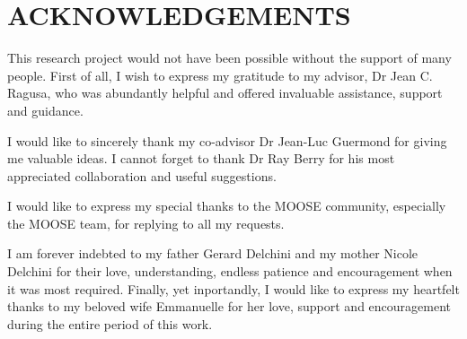 %
%
%


\chapter*{ACKNOWLEDGEMENTS}


\indent This research project would not have been possible without the support of many people. First of all, I wish to express my gratitude to my advisor, Dr Jean C. Ragusa, who was abundantly helpful and offered invaluable assistance, support and guidance. 

I would like to sincerely thank my co-advisor Dr Jean-Luc Guermond for giving me valuable ideas. I cannot forget to thank Dr Ray Berry for his most appreciated collaboration and useful suggestions.

I would like to express my special thanks to the MOOSE community, especially the MOOSE team, for replying to all my requests.

I am forever indebted to my father Gerard Delchini and my mother Nicole Delchini for their love, understanding, endless patience and encouragement when it was most required. Finally, yet inportandly, I would like to express my heartfelt thanks to my beloved wife Emmanuelle for her love, support and encouragement during the entire period of this work.
\pagebreak{}